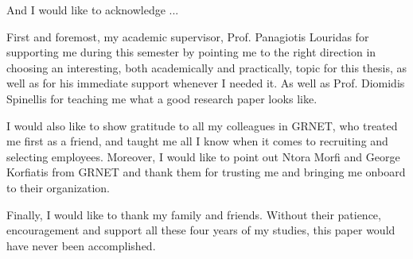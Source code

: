 
\begin{acknowledgements}      


And I would like to acknowledge ...

First and foremost,  my academic supervisor, Prof. Panagiotis Louridas
for supporting me during this semester by pointing me to the right
direction in choosing an interesting, both academically and practically,
topic for this thesis, as well as for his immediate support whenever I 
needed it. As well as Prof. Diomidis Spinellis for teaching me what a good
research paper looks like.

I would also like to show gratitude to all my colleagues in GRNET,
who treated me first as a friend, and taught me all I know when it comes to
recruiting and selecting employees. Moreover, I would like to point out Ntora Morfi
and George Korfiatis from GRNET and thank them for trusting me and bringing me onboard
to their organization.

Finally, I would like to thank my family and friends.
Without their patience, encouragement and support all these four years of my studies,
this paper would have never been accomplished.


\end{acknowledgements}
